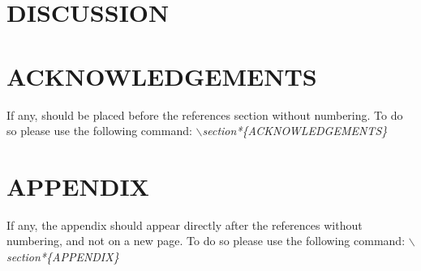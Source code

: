 \documentclass[a4paper,10pt]{article}
\begin{document}
\section{\uppercase{Discussion}}
\section*{\uppercase{Acknowledgements}}

\noindent If any, should be placed before the references section
without numbering. To do so please use the following command:
\textit{$\backslash$section*\{ACKNOWLEDGEMENTS\}}


\vfill

{\small
}


\section*{\uppercase{Appendix}}

\noindent If any, the appendix should appear directly after the
references without numbering, and not on a new page. To do so please use the following command:
\textit{$\backslash$section*\{APPENDIX\}}

\vfill
\end{document}

